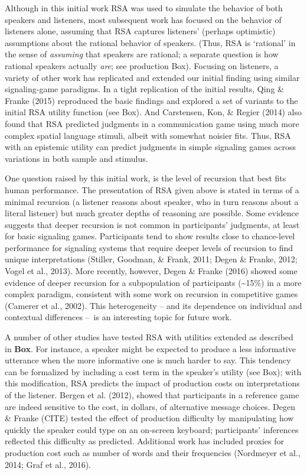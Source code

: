 \documentclass[]{elsarticle}
\begin{document}
Although in this initial work RSA was used to simulate the behavior of
both speakers and listeners, most subsequent work has focused on the
behavior of listeners alone, assuming that RSA captures listeners'
(perhaps optimistic) assumptions about the rational behavior of
speakers. (Thus, RSA is `rational' in the sense of \emph{assuming} that
speakers are rational; a separate question is how rational speakers
actually \emph{are}; see production Box). Focusing on listeners, a
variety of other work has replicated and extended our initial finding
using similar signaling-game paradigms. In a tight replication of the
initial results, Qing \& Franke (2015) reproduced the basic findings and
explored a set of variants to the initial RSA utility function (see
Box). And Carstensen, Kon, \& Regier (2014) also found that RSA
predicted judgments in a communication game using much more complex
spatial language stimuli, albeit with somewhat noisier fits. Thus, RSA
with an epistemic utility can predict judgments in simple signaling
games across variations in both sample and stimulus.

One question raised by this initial work, is the level of recursion that
best fits human performance. The presentation of RSA given above is
stated in terms of a minimal recursion (a listener reasons about
speaker, who in turn reasons about a literal listener) but much greater
depths of reasoning are possible. Some evidence suggests that deeper
recursion is not common in participants' judgments, at least for basic
signaling games. Participants tend to show results close to chance-level
performance for signaling systems that require deeper levels of
recursion to find unique interpretations (Stiller, Goodman, \& Frank,
2011; Degen \& Franke, 2012; Vogel et al., 2013). More recently,
however, Degen \& Franke (2016) showed some evidence of deeper recursion
for a subpopulation of participants (\textasciitilde{}15\%) in a more
complex paradigm, consistent with some work on recursion in competitive
games (Camerer et al., 2002). This heterogeneity -- and its dependence
on individual and contextual differences --~is an interesting topic for
future work.

A number of other studies have tested RSA with utilities extended as
described in \textbf{Box}. For instance, a speaker might be expected to
produce a less informative utterance when the more informative one is
much harder to say. This tendency can be formalized by including a cost
term in the speaker's utility (see Box); with this modification, RSA
predicts the impact of production costs on interpretations of the
listener. Bergen et al. (2012), showed that participants in a reference
game are indeed sensitive to the cost, in dollars, of alternative
message choices. Degen \& Franke (CITE) tested the effect of production
difficulty by manipulating how quickly the speaker could type on an
on-screen keyboard; participants' inferences reflected this difficulty
as predicted. Additional work has included proxies for production cost
such as number of words and their frequencies (Nordmeyer et al., 2014;
Graf et al., 2016).
\end{document}
